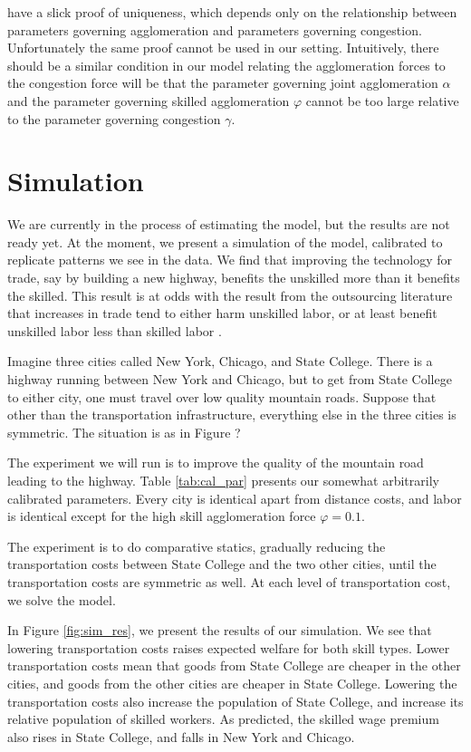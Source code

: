 \documentclass[12 pt]{article}
\begin{document}
\citet{allen2014trade} have a slick proof of uniqueness, which depends only on the relationship between parameters governing agglomeration and parameters governing congestion.  Unfortunately the same proof cannot be used in our setting.  Intuitively, there should be a similar condition in our model relating the agglomeration forces to the congestion force will be that the parameter governing joint agglomeration $\alpha$ and the parameter governing skilled agglomeration $\varphi$ cannot be too large relative to the parameter governing congestion $\gamma$.  

\section{Simulation}

We are currently in the process of estimating the model, but the results are not ready yet.  At the moment, we present a simulation of the model, calibrated to replicate patterns we see in the data.  We find that improving the technology for trade, say by building a new highway, benefits the unskilled more than it benefits the skilled.  This result is at odds with the result from the outsourcing literature that increases in trade tend to either harm unskilled labor, or at least benefit unskilled labor less than skilled labor \citep{hummels2014wage}.

Imagine three cities called New York, Chicago, and State College.  There is a highway running between New York and Chicago, but to get from State College to either city, one must travel over low quality mountain roads.  Suppose that other than the transportation infrastructure, everything else in the three cities is symmetric.  The situation is as in Figure ? 


The experiment we will run is to improve the quality of the mountain road leading to the highway.  Table \ref{tab:cal_par} presents our somewhat arbitrarily calibrated parameters.  Every city is identical apart from distance costs, and labor is identical except for the high skill agglomeration force $\varphi = 0.1$.

The experiment is to do comparative statics, gradually reducing the transportation costs between State College and the two other cities, until the transportation costs are symmetric as well.  At each level of transportation cost, we solve the model.

In Figure \ref{fig:sim_res}, we present the results of our simulation.  We see that lowering transportation costs raises expected welfare for both skill types.  Lower transportation costs mean that goods from State College are cheaper in the other cities, and goods from the other cities are cheaper in State College.  Lowering the transportation costs also increase the population of State College, and increase its relative population of skilled workers.  As predicted, the skilled wage premium also rises in State College, and falls in New York and Chicago.  
\end{document}
